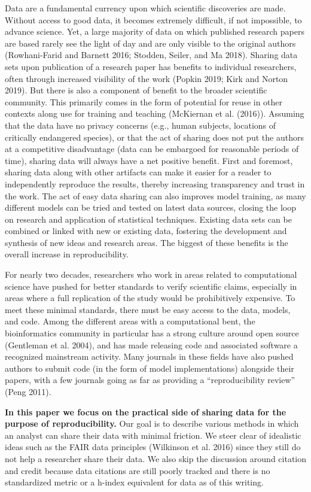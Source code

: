 \documentclass[
]{article}
\begin{document}
Data are a fundamental currency upon which scientific discoveries are made. Without access to good data, it becomes extremely difficult, if not impossible, to advance science. Yet, a large majority of data on which published research papers are based rarely see the light of day and are only visible to the original authors (Rowhani-Farid and Barnett 2016; Stodden, Seiler, and Ma 2018). Sharing data sets upon publication of a research paper has benefits to individual researchers, often through increased visibility of the work (Popkin 2019; Kirk and Norton 2019). But there is also a component of benefit to the broader scientific community. This primarily comes in the form of potential for reuse in other contexts along use for training and teaching (McKiernan et al. (2016)). Assuming that the data have no privacy concerns (e.g., human subjects, locations of critically endangered species), or that the act of sharing does not put the authors at a competitive disadvantage (data can be embargoed for reasonable periods of time), sharing data will always have a net positive benefit. First and foremost, sharing data along with other artifacts can make it easier for a reader to independently reproduce the results, thereby increasing transparency and trust in the work. The act of easy data sharing can also improves model training, as many different models can be tried and tested on latest data sources, closing the loop on research and application of statistical techniques. Existing data sets can be combined or linked with new or existing data, fostering the development and synthesis of new ideas and research areas. The biggest of these benefits is the overall increase in reproducibility.

For nearly two decades, researchers who work in areas related to computational science have pushed for better standards to verify scientific claims, especially in areas where a full replication of the study would be prohibitively expensive. To meet these minimal standards, there must be easy access to the data, models, and code. Among the different areas with a computational bent, the bioinformatics community in particular has a strong culture around open source (Gentleman et al. 2004), and has made releasing code and associated software a recognized mainstream activity. Many journals in these fields have also pushed authors to submit code (in the form of model implementations) alongside their papers, with a few journals going as far as providing a ``reproducibility review'' (Peng 2011).

\textbf{In this paper we focus on the practical side of sharing data for the purpose of reproducibility.} Our goal is to describe various methods in which an analyst can share their data with minimal friction. We steer clear of idealistic ideas such as the FAIR data principles (Wilkinson et al. 2016) since they still do not help a researcher share their data. We also skip the discussion around citation and credit because data citations are still poorly tracked and there is no standardized metric or a h-index equivalent for data as of this writing.
\end{document}
